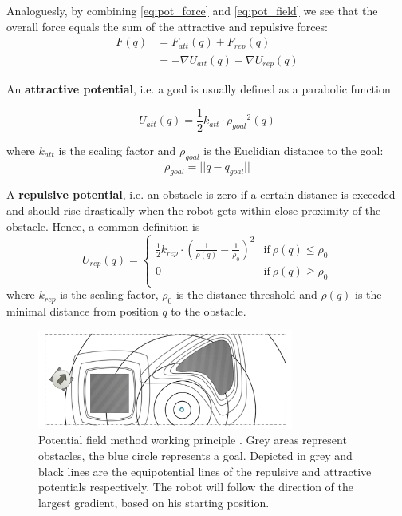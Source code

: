 Analoguesly, by combining \ref{eq:pot_force} and \ref{eq:pot_field} we see that the overall force equals the sum of the attractive and repulsive forces:
\begin{equation}
\begin{aligned}
F(q) &= F_{att}(q) + F_{rep}(q) \\
&= -\nabla U_{att}(q)-\nabla U_{rep}(q)
\end{aligned}
\end{equation}


An \textbf{attractive potential}, i.e. a goal is usually defined as a parabolic function

\begin{equation}
U_{att}(q) = \frac{1}{2} k_{att} \cdot {\rho_{goal}}^2(q)
\end{equation}

where $k_{att}$ is the scaling factor and $\rho_{goal}$ is the Euclidian distance to the goal:
\begin{equation}
\rho_{goal} = ||q-q_{goal}||
\end{equation}


A \textbf{repulsive potential}, i.e. an obstacle is zero if a certain distance is exceeded and should rise drastically when the robot gets within close proximity of the obstacle. Hence, a common definition is
\begin{equation}
U_{rep}(q) = \begin{cases}
      \frac{1}{2} k_{rep}\cdot (\frac{1}{\rho (q)}-\frac{1}{\rho_0})^2 & \text{if}\ \rho (q) \leq \rho_0 \\
      0 & \text{if}\ \rho (q) \geq \rho_0 \\
    \end{cases}
    \label{eq:pot_field_repulsive}
\end{equation}
where $k_{rep}$ is the scaling factor, $\rho_0$ is the distance threshold and $\rho (q)$ is the minimal distance from position $q$ to the obstacle.

\begin{figure}[h]
   \centering
   \includegraphics[width=0.75\textwidth]{images/pot_field.png}
   \caption{Potential field method working principle \citep{siegwart2004autonomous}. Grey areas represent obstacles, the blue circle represents a goal. Depicted in grey and black lines are the equipotential lines of the repulsive and attractive potentials respectively. The robot will follow the direction of the largest gradient, based on his starting position.} 
   \label{pics:pot_field}
\end{figure}

